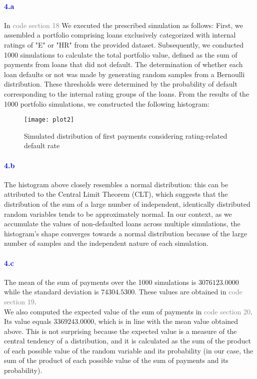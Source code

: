 \documentclass[a4paper,12pt]{article}
\begin{document}
\paragraph{\textcolor{Blue}{4.a}} In \textcolor{gray}{code section 18} We executed the prescribed simulation as follows: First, we assembled a portfolio comprising loans exclusively categorized with internal ratings of "E" or "HR" from the provided dataset. Subsequently, we conducted 1000 simulations to calculate the total portfolio value, defined as the sum of payments from loans that did not default. The determination of whether each loan defaults or not was made by generating random samples from a Bernoulli distribution. These thresholds were determined by the probability of default corresponding to the internal rating groups of the loans. From the results of the 1000 portfolio simulations, we constructed the following histogram: 
\begin{figure} [H]
    \centering
    \texttt{[image: plot2]}
    \caption{Simulated distribution of first payments considering rating-related default rate} 
\end{figure}
\paragraph{\textcolor{Blue}{4.b}} The histogram above closely resembles a normal distribution: this can be attributed to the Central Limit Theorem (CLT), which suggests that the distribution of the sum of a large number of independent, identically distributed random variables tends to be approximately normal. In our context, as we accumulate the values of non-defaulted loans across multiple simulations, the histogram's shape converges towards a normal distribution because of the large number of samples and the independent nature of each simulation.
\paragraph{\textcolor{Blue}{4.c}} The mean of the sum of payments over the 1000 simulations is $3076123.0000$ while the standard deviation is $74304.5300$. These values are obtained in \textcolor{gray}{code section 19}.\\
We also computed the expected value of the sum of payments in \textcolor{gray}{code section 20}. Its value equals $3369243.0000$, which is in line with the mean value obtained above. This is not surprising because the expected value is a measure of the central tendency of a distribution, and it is calculated as the sum of the product of each possible value of the random variable and its probability (in our case, the sum of the product of each possible value of the sum of payments and its probability).
\end{document}
